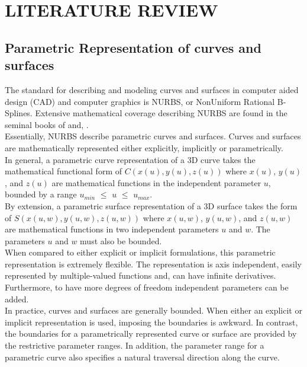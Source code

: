 \chapter{LITERATURE REVIEW}


\section{Parametric Representation of curves and surfaces}

The standard for describing and modeling curves and surfaces in computer aided design (CAD) and computer graphics is NURBS, or NonUniform Rational B-Splines. Extensive mathematical coverage describing NURBS are found in the seminal books of \cite{Rogers:2001} and, \cite{Piegl-etal:1997}. \\

Essentially, NURBS describe parametric curves and surfaces. Curves and surfaces are mathematically represented either explicitly, implicitly or parametrically. \\

In general, a parametric curve representation of a 3D curve takes the mathematical functional form of $C(x(u), y(u), z(u))$ where $x(u)$, $y(u)$, and $z(u)$ are mathematical functions in the independent parameter $u$, bounded by a range $u_{min}$ $\le$  $u$ $\le$ $u_{max}$.\\
 
By extension, a parametric surface representation of a 3D surface takes the form of $S(x(u,w), y(u,w), z(u,w))$ where $x(u,w)$, $y(u,w)$, and $z(u,w)$ are mathematical functions in two independent parameters $u$ and $w$. The parameters $u$ and $w$ must also be bounded.\\
 
When compared to either explicit or implicit formulations, this parametric representation is extremely flexible. The representation is axis independent, easily represented by multiple-valued functions and, can have infinite derivatives. Furthermore, to have more degrees of freedom independent parameters can be added.\\

In practice, curves and surfaces are generally bounded. When either an explicit or implicit representation is used, imposing the boundaries is awkward. In contrast, the boundaries for a parametrically represented curve or surface are provided by the restrictive parameter ranges. In addition, the parameter range for a parametric curve also specifies a natural traversal direction along the curve. \\

